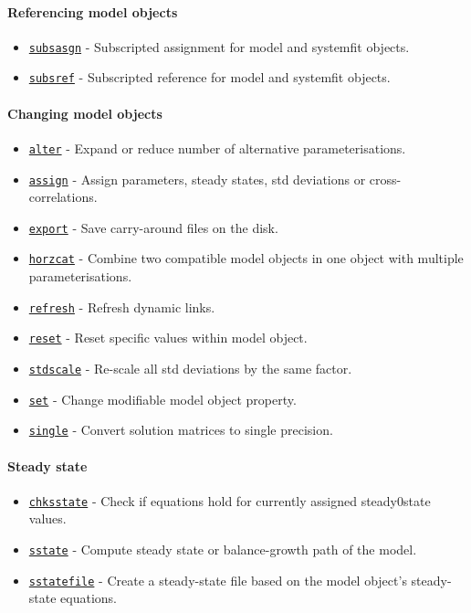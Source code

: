  \paragraph{Referencing model objects}
 
 \begin{itemize}
 \item
   \href{model/subsasgn}{\texttt{subsasgn}} - Subscripted assignment for
   model and systemfit objects.
 \item
   \href{model/subsref}{\texttt{subsref}} - Subscripted reference for
   model and systemfit objects.
 \end{itemize}
 
 \paragraph{Changing model objects}
 
 \begin{itemize}
 \item
   \href{model/alter}{\texttt{alter}} - Expand or reduce number of
   alternative parameterisations.
 \item
   \href{model/assign}{\texttt{assign}} - Assign parameters, steady
   states, std deviations or cross-correlations.
 \item
   \href{model/export}{\texttt{export}} - Save carry-around files on the
   disk.
 \item
   \href{model/horzcat}{\texttt{horzcat}} - Combine two compatible model
   objects in one object with multiple parameterisations.
 \item
   \href{model/refresh}{\texttt{refresh}} - Refresh dynamic links.
 \item
   \href{model/reset}{\texttt{reset}} - Reset specific values within
   model object.
 \item
   \href{model/stdscale}{\texttt{stdscale}} - Re-scale all std deviations
   by the same factor.
 \item
   \href{model/set}{\texttt{set}} - Change modifiable model object
   property.
 \item
   \href{model/single}{\texttt{single}} - Convert solution matrices to
   single precision.
 \end{itemize}
 
 \paragraph{Steady state}
 
 \begin{itemize}
 \item
   \href{model/chksstate}{\texttt{chksstate}} - Check if equations hold
   for currently assigned steady0state values.
 \item
   \href{model/sstate}{\texttt{sstate}} - Compute steady state or
   balance-growth path of the model.
 \item
   \href{model/sstatefile}{\texttt{sstatefile}} - Create a steady-state
   file based on the model object's steady-state equations.
 \end{itemize}
 

